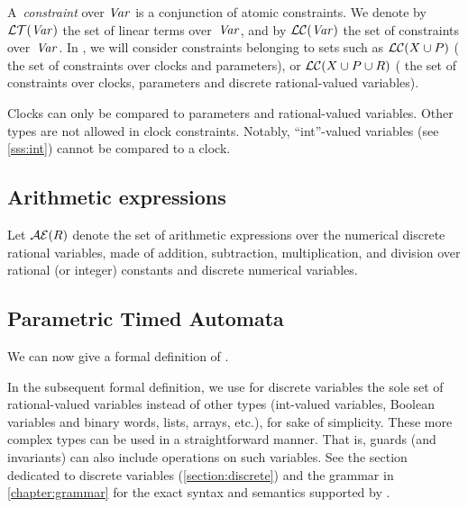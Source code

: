 A~\emph{constraint} over $\mathit{Var}$ is a conjunction of atomic constraints.
We denote by $\mathcal{LT}(\mathit{Var})$ the set of linear terms over~$\mathit{Var}$, and by $\mathcal{LC}(\mathit{Var})$ the set of constraints over~$\mathit{Var}$.
In \imitator{}, we will consider constraints belonging to sets such as $\mathcal{LC}(X \cup P)$ (\ie{} the set of constraints over clocks and parameters), or $\mathcal{LC}(X \cup P \cup R)$ (\ie{} the set of constraints over clocks, parameters and discrete rational-valued variables).

\begin{becareful}
	Clocks can only be compared to parameters and rational-valued variables.
	Other types are not allowed in clock constraints.
	Notably, ``int''-valued variables (see \cref{sss:int}) cannot be compared to a clock.
\end{becareful}


\subsection{Arithmetic expressions}

Let $\mathcal{AE}(R)$ denote the set of arithmetic expressions over the numerical discrete rational variables, \ie{} made of addition, subtraction, multiplication, and division over rational (or integer) constants and discrete numerical variables.



\subsection{\imitator{} Parametric Timed Automata}


We can now give a formal definition of \IPTA{}.

\begin{remark}
	In the subsequent formal definition, we use for discrete variables the sole set of rational-valued variables instead of other types (int-valued variables, Boolean variables and binary words, lists, arrays, etc.), for sake of simplicity.
	These more complex types can be used in a straightforward manner.
	That is, guards (and invariants) can also include operations on such variables.
	See the section dedicated to discrete variables (\cref{section:discrete}) and the grammar in \cref{chapter:grammar} for the exact syntax and semantics supported by \imitator{}.
\end{remark}

